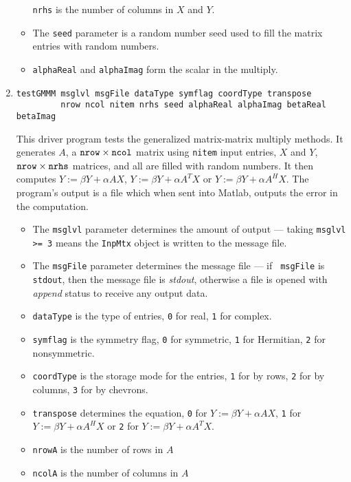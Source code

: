 \begin{enumerate}
\begin{itemize}
{\tt nrhs} is the number of columns in $X$ and $Y$.
\item
The {\tt seed} parameter is a random number seed used to fill the
matrix entries with random numbers.
\item
{\tt alphaReal} and {\tt alphaImag} form the scalar in the multiply.
\end{itemize}
\item
\begin{verbatim}
testGMMM msglvl msgFile dataType symflag coordType transpose
         nrow ncol nitem nrhs seed alphaReal alphaImag betaReal betaImag
\end{verbatim}
This driver program 
tests the generalized matrix-matrix multiply methods.
It generates $A$, a 
${\tt nrow} \times {\tt ncol}$
matrix using {\tt nitem} input entries, $X$ and $Y$,
${\tt nrow} \times {\tt nrhs}$ matrices,
and all are filled with random numbers.
It then computes 
$Y := \beta Y + \alpha A X$, 
$Y := \beta Y + \alpha A^T X$ or
$Y := \beta Y + \alpha A^H X$.
The program's output is a file which when sent into Matlab,
outputs the error in the computation.
\par
\begin{itemize}
\item
The {\tt msglvl} parameter determines the amount of output ---
taking {\tt msglvl >= 3} means the {\tt InpMtx} object is written
to the message file.
\item
The {\tt msgFile} parameter determines the message file --- if {\tt
msgFile} is {\tt stdout}, then the message file is {\it stdout},
otherwise a file is opened with {\it append} status to receive any
output data.
\item
{\tt dataType} is the type of entries,
{\tt 0} for real, {\tt 1} for complex.
\item
{\tt symflag} is the symmetry flag, {\tt 0} for symmetric, 
{\tt 1} for Hermitian, {\tt 2} for nonsymmetric.
\item
{\tt coordType} is the storage mode for the entries, 
{\tt 1} for by rows, {\tt 2} for by columns, 
{\tt 3} for by chevrons. 
\item
{\tt transpose} determines the equation,
{\tt 0} for $Y := \beta Y + \alpha A X$, 
{\tt 1} for $Y := \beta Y + \alpha A^H X$ or
{\tt 2} for $Y := \beta Y + \alpha A^T X$.
\item
{\tt nrowA} is the number of rows in $A$
\item
{\tt ncolA} is the number of columns in $A$

\end{itemize}
\end{enumerate}
